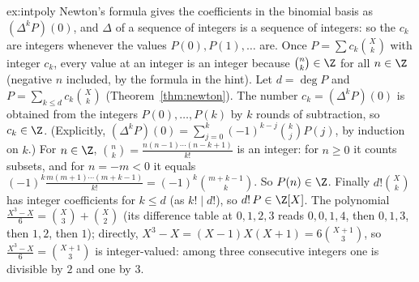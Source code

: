 \begin{solution}{ex:intpoly}
\idea Newton's formula gives the coefficients in the binomial basis as $(\Delta^kP)(0)$, and $\Delta$ of a sequence of integers is a sequence of integers: so the $c_k$ are integers whenever the values $P(0),P(1),\dots$ are. Once $P=\sum c_k\binom Xk$ with integer $c_k$, every value at an integer is an integer because $\binom nk\in\Z$ for all $n\in\Z$ (negative $n$ included, by the formula in the hint).
\writeup Let $d=\deg P$ and $P=\sum_{k\le d}c_k\binom Xk$ (Theorem~\ref{thm:newton}). The number $c_k=(\Delta^kP)(0)$ is obtained from the integers $P(0),\dots,P(k)$ by $k$ rounds of subtraction, so $c_k\in\Z$. (Explicitly, $(\Delta^kP)(0)=\sum_{j=0}^k(-1)^{k-j}\binom kjP(j)$, by induction on $k$.) For $n\in\Z$, $\binom nk=\frac{n(n-1)\cdots(n-k+1)}{k!}$ is an integer: for $n\ge0$ it counts subsets, and for $n=-m<0$ it equals $(-1)^k\frac{m(m+1)\cdots(m+k-1)}{k!}=(-1)^k\binom{m+k-1}k$. So $P(n)\in\Z$. Finally $d!\binom Xk$ has integer coefficients for $k\le d$ (as $k!\mid d!$), so $d!\,P\in\Z[X]$. The polynomial $\frac{X^3-X}6=\binom X3+\binom X2$ (its difference table at $0,1,2,3$ reads $0,0,1,4$, then $0,1,3$, then $1,2$, then $1$); directly, $X^3-X=(X-1)X(X+1)=6\binom{X+1}3$, so $\frac{X^3-X}6=\binom{X+1}3$ is integer-valued: among three consecutive integers one is divisible by $2$ and one by $3$.
\end{solution}

